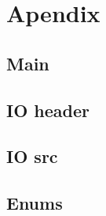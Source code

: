 \section*{\center Apendix}
\subsection*{\large Main}


\newpage
\subsection*{\large IO header}


\newpage
\subsection*{\large IO src}


\newpage
\subsection*{\large Enums}

